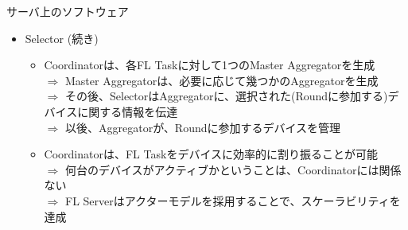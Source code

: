 \documentclass[dvipdfmx,notheorems,t]{beamer}
\begin{document}
\begin{frame}{サーバ上のソフトウェア}

\begin{itemize}
	\item \alert{Selector} (続き)
	\begin{itemize}
		\item Coordinatorは、各FL Taskに対して1つのMaster Aggregatorを生成 \\
		$\Rightarrow$ Master Aggregatorは、必要に応じて幾つかのAggregatorを生成 \\
		$\Rightarrow$ その後、SelectorはAggregatorに、選択された(Roundに参加する)デバイスに関する情報を伝達 \\
		$\Rightarrow$ 以後、Aggregatorが、Roundに参加するデバイスを管理
		\newline
		
		\item Coordinatorは、FL Taskをデバイスに効率的に割り振ることが可能 \\
		$\Rightarrow$ 何台のデバイスがアクティブかということは、Coordinatorには関係ない \\
		$\Rightarrow$ FL Serverはアクターモデルを採用することで、スケーラビリティを達成
	\end{itemize}
\end{itemize}

\end{frame}
\end{document}
